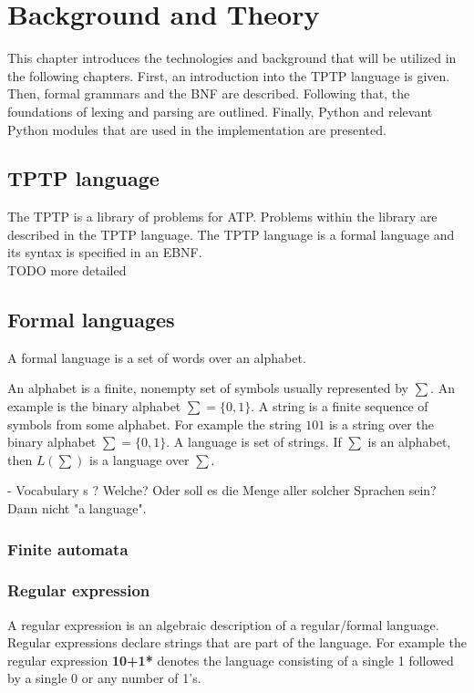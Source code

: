 
\chapter{Background and Theory}\label{cha:Background}
This chapter introduces the technologies and background that will be utilized in the following chapters. First, an introduction into the \ac{TPTP} language is given. Then, formal grammars and the \ac{BNF} are described. Following that, the foundations of lexing and parsing are outlined. Finally, Python and relevant Python modules that are used in the implementation are presented.

\section{TPTP language}\label{sec:BackgroundTPTP}
The \acf{TPTP} is a library of problems for \ac{ATP}.
Problems within the library are described in the \ac{TPTP} language.
The  \ac{TPTP} language is a formal language and its syntax is specified in an \ac{EBNF}. \cite{Sut17}\\

TODO more detailed

\section{Formal languages}\label{sec:BackgroundFormalLanguage}

A formal language is a set of words over an alphabet.

An alphabet is a finite, nonempty set of symbols usually represented by $\sum$. An example is the binary alphabet $\sum = \{0,1\}$.
A string is a finite sequence of symbols from some alphabet. For example the string $101$ is a string over the binary alphabet $\sum = \{0,1\}$.
A language is set of strings. If $\sum$ is an alphabet, then    $L(\sum)$ is a language over $\sum$. \cite{AutomataTheory.2007}

- Vocabulary
s ? Welche? Oder soll es die Menge aller solcher Sprachen sein? Dann nicht "a language".

\subsection{Finite automata}\label{sec:BackgroundAutomata}

\subsection{Regular expression}\label{sec:BackgroundRegEx}
A regular expression is an algebraic description of a regular/formal language. Regular expressions declare strings that are part of the language. \cite{AutomataTheory.2007} 
For example the regular expression \textbf{10+1*} denotes the language consisting of a single 1 followed by a single 0 or any number of 1's. 

